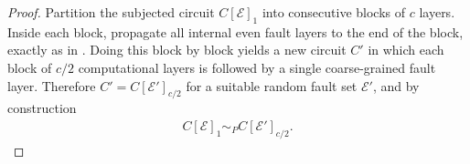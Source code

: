 \begin{proof}
  Partition the subjected circuit $C[\mathcal{E}]_{1}$ into consecutive blocks of $c$ layers. Inside each block, propagate all internal even fault layers to the end of the block, exactly as in . Doing this block by block yields a new circuit $C'$ in which each block of $c/2$ computational layers is followed by a single coarse-grained fault layer. Therefore $C' = C[\mathcal{E}']_{c/2}$ for a suitable random fault set $\mathcal{E}'$, and by construction
  \begin{equation*}
    \begin{split}
      C[\mathcal{E}]_{1} \sim_{P} C[\mathcal{E}']_{c/2}.
    \end{split}
  \end{equation*}


\end{proof}
